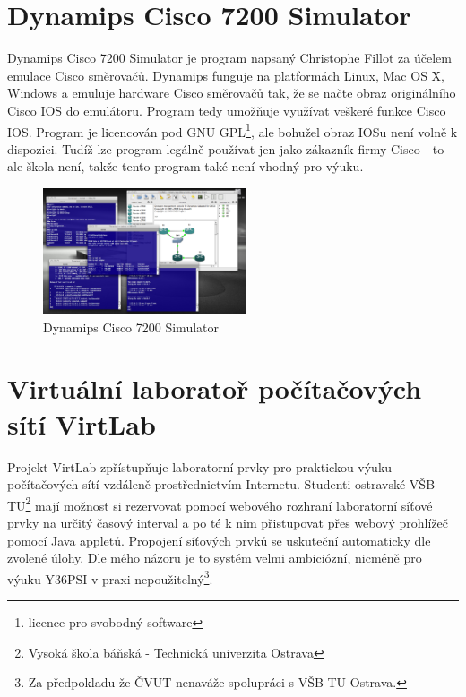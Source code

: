 \newpage

\section{Dynamips Cisco 7200 Simulator}
Dynamips Cisco 7200 Simulator \cite{reserse:dynamips} je program napsaný Christophe Fillot za účelem emulace Cisco směrovačů. Dynamips funguje na platformách Linux, Mac OS X, Windows a emuluje hardware Cisco směrovačů tak, že se načte obraz originálního Cisco IOS do emulátoru. Program tedy umožňuje využívat veškeré funkce Cisco IOS. Program je licencován pod GNU GPL\footnote{licence pro svobodný software}, ale bohužel obraz IOSu není volně k dispozici. Tudíž lze program legálně používat jen jako zákazník firmy Cisco - to ale škola není, takže tento program také není vhodný pro výuku.

\begin{figure}[h]
\begin{center}
\includegraphics[width=6cm]{figures/r_dynamips}
\caption{Dynamips Cisco 7200 Simulator}
\label{fig:r_dynamips}
\end{center}
\end{figure}


\section{Virtuální laboratoř počítačových sítí VirtLab}
Projekt VirtLab \cite{reserse:virtlab} zpřístupňuje laboratorní prvky pro praktickou výuku počítačových sítí vzdáleně prostřednictvím Internetu. Studenti ostravské VŠB-TU\footnote{Vysoká škola báňská - Technická univerzita Ostrava} mají možnost si rezervovat pomocí webového rozhraní laboratorní síťové prvky na určitý časový interval a po té k nim přistupovat přes webový prohlížeč pomocí Java appletů. Propojení síťových prvků se uskuteční automaticky dle zvolené úlohy. Dle mého názoru je to systém velmi ambiciózní, nicméně pro výuku Y36PSI v praxi nepoužitelný\footnote{Za předpokladu že ČVUT nenaváže spolupráci s VŠB-TU Ostrava.}.




